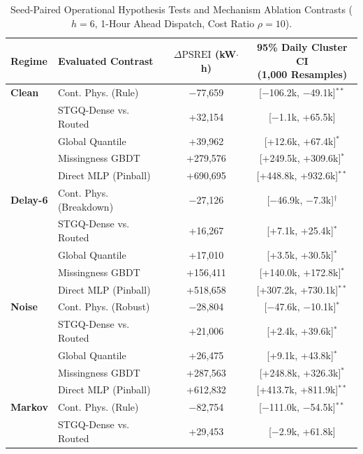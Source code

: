 \documentclass[
  journal]{IEEEtran}
\begin{document}
\begin{table}[!htbp]
\centering
\fontsize{8.0pt}{8.9pt}\selectfont
\setlength{\tabcolsep}{1.5pt}
\renewcommand{\arraystretch}{0.88}
\caption{Seed-Paired Operational Hypothesis Tests and Mechanism Ablation Contrasts ($h=6$, 1-Hour Ahead Dispatch, Cost Ratio $\rho=10$).}
\label{tab:h6-paired}
\begin{tabular*}{\columnwidth}{@{\extracolsep{\fill}}llcc@{}}
\toprule
Regime & Evaluated Contrast & \shortstack{$\Delta\text{PSREI}$\\(kW$\cdot$h)} & \shortstack{95\% Daily Cluster CI\\(1,000 Resamples)} \\
\midrule
\textbf{Clean} & Cont. Phys. (Rule) & $-$77,659 & [$-$106.2k, $-$49.1k]$^{\ast\ast}$ \\
 & STGQ-Dense vs. Routed & +32,154 & [$-$1.1k, +65.5k] \\
 & Global Quantile & +39,962 & [+12.6k, +67.4k]$^{\ast}$ \\
 & Missingness GBDT & +279,576 & [+249.5k, +309.6k]$^{\ast}$ \\
 & Direct MLP (Pinball) & +690,695 & [+448.8k, +932.6k]$^{\ast\ast}$ \\
\midrule
\textbf{Delay-6} & Cont. Phys. (Breakdown) & $-$27,126 & [$-$46.9k, $-$7.3k]$^{\dagger}$ \\
 & STGQ-Dense vs. Routed & +16,267 & [+7.1k, +25.4k]$^{\ast}$ \\
 & Global Quantile & +17,010 & [+3.5k, +30.5k]$^{\ast}$ \\
 & Missingness GBDT & +156,411 & [+140.0k, +172.8k]$^{\ast}$ \\
 & Direct MLP (Pinball) & +518,658 & [+307.2k, +730.1k]$^{\ast\ast}$ \\
\midrule
\textbf{Noise} & Cont. Phys. (Robust) & $-$28,804 & [$-$47.6k, $-$10.1k]$^{\ast}$ \\
 & STGQ-Dense vs. Routed & +21,006 & [+2.4k, +39.6k]$^{\ast}$ \\
 & Global Quantile & +26,475 & [+9.1k, +43.8k]$^{\ast}$ \\
 & Missingness GBDT & +287,563 & [+248.8k, +326.3k]$^{\ast}$ \\
 & Direct MLP (Pinball) & +612,832 & [+413.7k, +811.9k]$^{\ast\ast}$ \\
\midrule
\textbf{Markov} & Cont. Phys. (Rule) & $-$82,754 & [$-$111.0k, $-$54.5k]$^{\ast\ast}$ \\
 & STGQ-Dense vs. Routed & +29,453 & [$-$2.9k, +61.8k] \\

\end{tabular*}
\end{table}
\end{document}

